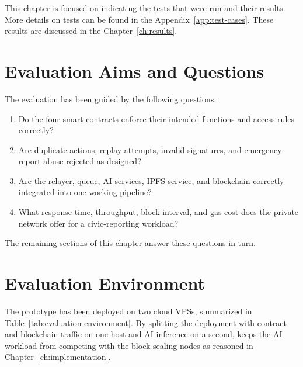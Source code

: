 This chapter is focused on indicating the tests that were run and their results. More details on tests can be found in the Appendix~\ref{app:test-cases}. These results are discussed in the Chapter~\ref{ch:results}. 

\section{Evaluation Aims and Questions}
\label{sec:evaluation-aims}

The evaluation has been guided by the following questions. 

\begin{enumerate}
    \item Do the four smart contracts enforce their intended functions and access rules correctly?
    \item Are duplicate actions, replay attempts, invalid signatures, and emergency-report abuse rejected as designed?
    \item Are the relayer, queue, AI services, IPFS service, and blockchain correctly integrated into one working pipeline?
    \item What response time, throughput, block interval, and gas cost does the private network offer for a civic-reporting workload?
\end{enumerate}

The remaining sections of this chapter answer these questions in turn.

\section{Evaluation Environment}
\label{sec:evaluation-environment}

The prototype has been deployed on two cloud \ac{VPS}s, summarized in Table~\ref{tab:evaluation-environment}. By splitting the deployment with contract and blockchain traffic on one host and AI inference on a second, keeps the AI workload from competing with the block-sealing nodes as reasoned in Chapter~\ref{ch:implementation}.

